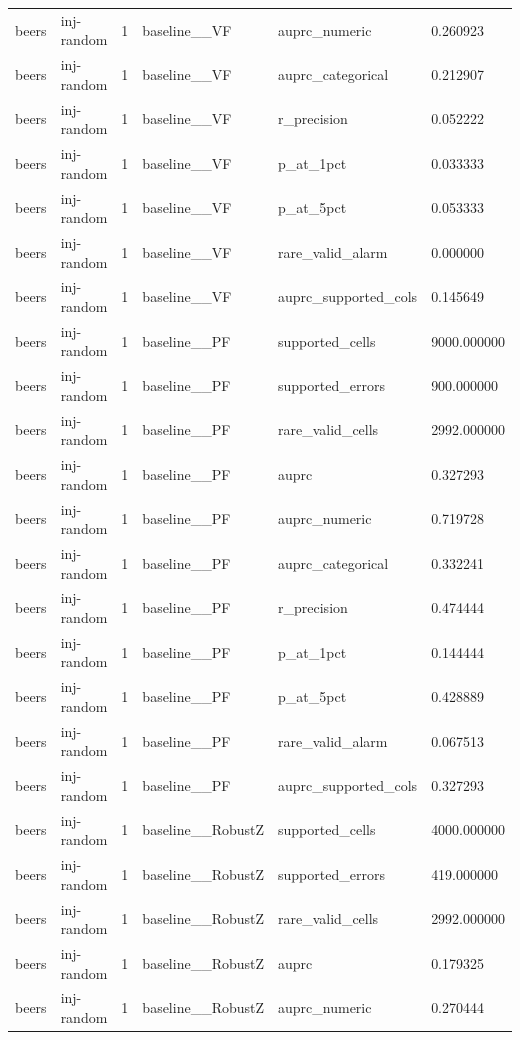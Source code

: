 \begin{tabular}{llllll}
beers & inj-random & 1 & baseline\_\_VF & auprc\_numeric & 0.260923 \\
beers & inj-random & 1 & baseline\_\_VF & auprc\_categorical & 0.212907 \\
beers & inj-random & 1 & baseline\_\_VF & r\_precision & 0.052222 \\
beers & inj-random & 1 & baseline\_\_VF & p\_at\_1pct & 0.033333 \\
beers & inj-random & 1 & baseline\_\_VF & p\_at\_5pct & 0.053333 \\
beers & inj-random & 1 & baseline\_\_VF & rare\_valid\_alarm & 0.000000 \\
beers & inj-random & 1 & baseline\_\_VF & auprc\_supported\_cols & 0.145649 \\
beers & inj-random & 1 & baseline\_\_PF & supported\_cells & 9000.000000 \\
beers & inj-random & 1 & baseline\_\_PF & supported\_errors & 900.000000 \\
beers & inj-random & 1 & baseline\_\_PF & rare\_valid\_cells & 2992.000000 \\
beers & inj-random & 1 & baseline\_\_PF & auprc & 0.327293 \\
beers & inj-random & 1 & baseline\_\_PF & auprc\_numeric & 0.719728 \\
beers & inj-random & 1 & baseline\_\_PF & auprc\_categorical & 0.332241 \\
beers & inj-random & 1 & baseline\_\_PF & r\_precision & 0.474444 \\
beers & inj-random & 1 & baseline\_\_PF & p\_at\_1pct & 0.144444 \\
beers & inj-random & 1 & baseline\_\_PF & p\_at\_5pct & 0.428889 \\
beers & inj-random & 1 & baseline\_\_PF & rare\_valid\_alarm & 0.067513 \\
beers & inj-random & 1 & baseline\_\_PF & auprc\_supported\_cols & 0.327293 \\
beers & inj-random & 1 & baseline\_\_RobustZ & supported\_cells & 4000.000000 \\
beers & inj-random & 1 & baseline\_\_RobustZ & supported\_errors & 419.000000 \\
beers & inj-random & 1 & baseline\_\_RobustZ & rare\_valid\_cells & 2992.000000 \\
beers & inj-random & 1 & baseline\_\_RobustZ & auprc & 0.179325 \\
beers & inj-random & 1 & baseline\_\_RobustZ & auprc\_numeric & 0.270444 \\

\end{tabular}

